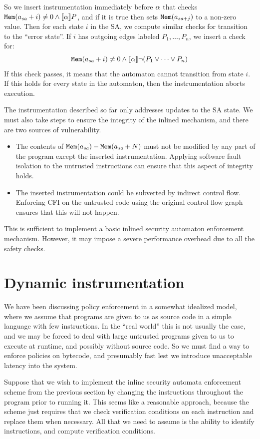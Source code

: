 \documentclass[11pt,twoside]{scrartcl}
\begin{document}
So we insert instrumentation immediately before $\alpha$ that checks $\pderef{a_{\textit{sa}}+i} \ne 0 \land \dbox{\asprg}{\ausfml}$, and if it is true then sets $\texttt{\upshape Mem}(a_{\textit{sa}+j})$ to a non-zero value. Then for each state $i$ in the SA, we compute similar checks for transition to the ``error state''. If $i$ has outgoing edges labeled $P_1, \ldots, P_n$, we insert a check for:
\begin{equation}
\pderef{a_{\textit{sa}}+i} \ne 0 \land \dbox{\asprg}{\lnot(P_1 \lor \cdots \lor P_n)}
\end{equation}
If this check passes, it means that the automaton cannot transition from state $i$. If this holds for every state in the automaton, then the instrumentation aborts execution.

The instrumentation described so far only addresses updates to the SA state. We must also take steps to ensure the integrity of the inlined mechanism, and there are two sources of vulnerability.
\begin{itemize}
\item The contents of $\texttt{\upshape Mem}(a_{\textit{sa}}) - \texttt{\upshape Mem}(a_{\textit{sa}}+N)$ must not be modified by any part of the program except the inserted instrumentation. Applying software fault isolation to the untrusted instructions can ensure that this aspect of integrity holds.
\item The inserted instrumentation could be subverted by indirect control flow. Enforcing CFI on the untrusted code using the original control flow graph ensures that this will not happen.
\end{itemize}
This is sufficient to implement a basic inlined security automaton enforcement mechanism. However, it may impose a severe performance overhead due to all the safety checks.

\section{Dynamic instrumentation}
We have been discussing policy enforcement in a somewhat idealized model, where we assume that programs are given to us as source code in a simple language with few instructions. In the ``real world'' this is not usually the case, and we may be forced to deal with large untrusted programs given to us to execute at runtime, and possibly without source code. So we must find a way to enforce policies on bytecode, and presumably fast lest we introduce unacceptable latency into the system.

Suppose that we wish to implement the inline security automata enforcement scheme from the previous section by changing the instructions throughout the program prior to running it. This seems like a reasonable approach, because the scheme just requires that we check verification conditions on each instruction and replace them when necessary. All that we need to assume is the ability to identify instructions, and compute verification conditions.
\end{document}
